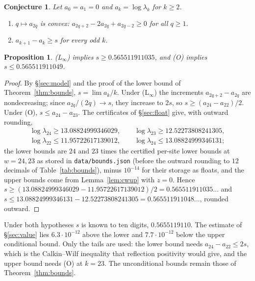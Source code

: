 \documentclass[11pt]{amsart}
\newtheorem{proposition}[theorem]{Proposition}
\newtheorem{conjecture}[theorem]{Conjecture}
\theoremstyle{definition}
\theoremstyle{remark}
\newcommand{\file}[1]{\texttt{#1}}
\begin{document}
\begin{conjecture}\label{conj:Linf}
Let $a_0 = a_1 = 0$ and $a_k = \log\lambda_k$ for $k \ge 2$.
\begin{enumerate}
\item[(L$_\infty$)] $q \mapsto a_{2q}$ is convex: $a_{2q+2} - 2a_{2q} + a_{2q-2} \ge 0$ for all
  $q \ge 1$.
\item[(O)] $a_{k+1} - a_k \ge s$ for every odd $k$.
\end{enumerate}
\end{conjecture}

\begin{proposition}\label{prop:cond}
(L$_\infty$) implies $s \ge 0.565511911035$, and (O) implies $s \le 0.565511911049$.
\end{proposition}
\begin{proof}
By \S\ref{sec:model} and the proof of the lower bound of Theorem~\ref{thm:bounds},
$s = \lim a_k/k$. Under
(L$_\infty$) the increments $a_{2q+2} - a_{2q}$ are nondecreasing; since $a_{2q}/(2q) \to s$, they
increase to $2s$, so $s \ge (a_{24} - a_{22})/2$. Under (O), $s \le a_{24} - a_{23}$. The certificates
of \S\ref{sec:float} give, with outward rounding,
\begin{gather*}
  \log\lambda_{24} \ge 13.08824999346029, \qquad \log\lambda_{23} \ge 12.52273808241305,\\
  \log\lambda_{22} \le 11.95722617139012, \qquad \log\lambda_{24} \le 13.08824999346131;
\end{gather*}
the lower bounds are $24$ and $23$ times the certified per-site lower bounds at $w = 24, 23$ as
stored in \file{data/bounds.json} (before the outward rounding to $12$ decimals of
Table~\ref{tab:bounds}), minus $10^{-14}$ for their storage as floats, and the upper bounds come from Lemma~\ref{lem:cwup} with
$z = 0$. Hence $s \ge (13.08824999346029 - 11.95722617139012)/2 = 0.565511911035\ldots$ and
$s \le 13.08824999346131 - 12.52273808241305 = 0.565511911048\ldots$, rounded outward.
\end{proof}

Under both hypotheses $s$ is known to ten digits, $0.5655119110$. The estimate of
\S\ref{sec:value} lies $6.3\cdot10^{-12}$ above the lower and $7.7\cdot10^{-12}$ below the upper
conditional bound. Only the tails are used: the lower bound needs $a_{24} - a_{22} \le 2s$, which is
the Calkin--Wilf inequality that reflection positivity would give, and the upper bound needs (O)
at $k = 23$. The unconditional bounds remain those of Theorem~\ref{thm:bounds}.
\end{document}
